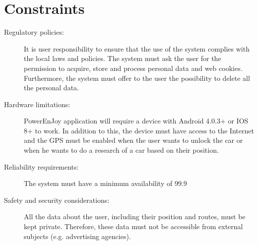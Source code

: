 \section{Constraints}
\begin{description}
\item[Regulatory policies:] It is user responsibility to ensure that the use of the system complies with the
local laws and policies.
The system must ask the user for the permission to acquire, store and process personal data and web cookies. Furthermore, the system must oﬀer to the user the possibility to delete all the personal data.
\item[Hardware limitations:] PowerEnJoy application will require a device with Android 4.0.3+ or IOS 8+ to work. In addition to this, the device must have access to the Internet and the GPS must be enabled when the user wants to unlock the car or when he wants to do a research of a car based on their position.
\item[Reliability requirements:] The system must have a minimum availability of 99.9%
\item[Safety and security considerations:] All the data about the user, including their position and routes, must be kept private.
Therefore, these data must not be accessible from external subjects (e.g. advertising agencies).
\end{description}
